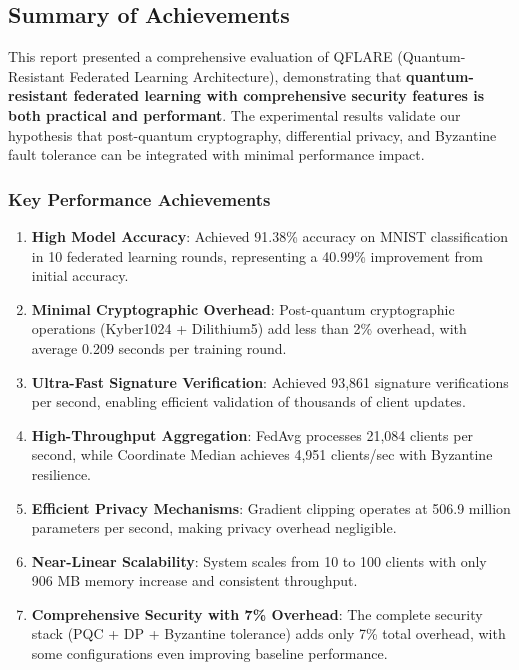 \documentclass[12pt,a4paper]{article}
\begin{document}
\subsection{Summary of Achievements}

This report presented a comprehensive evaluation of QFLARE (Quantum-Resistant Federated Learning Architecture), demonstrating that \textbf{quantum-resistant federated learning with comprehensive security features is both practical and performant}. The experimental results validate our hypothesis that post-quantum cryptography, differential privacy, and Byzantine fault tolerance can be integrated with minimal performance impact.

\subsubsection{Key Performance Achievements}

\begin{enumerate}
    \item \textbf{High Model Accuracy}: Achieved 91.38\% accuracy on MNIST classification in 10 federated learning rounds, representing a 40.99\% improvement from initial accuracy.
    
    \item \textbf{Minimal Cryptographic Overhead}: Post-quantum cryptographic operations (Kyber1024 + Dilithium5) add less than 2\% overhead, with average 0.209 seconds per training round.
    
    \item \textbf{Ultra-Fast Signature Verification}: Achieved 93,861 signature verifications per second, enabling efficient validation of thousands of client updates.
    
    \item \textbf{High-Throughput Aggregation}: FedAvg processes 21,084 clients per second, while Coordinate Median achieves 4,951 clients/sec with Byzantine resilience.
    
    \item \textbf{Efficient Privacy Mechanisms}: Gradient clipping operates at 506.9 million parameters per second, making privacy overhead negligible.
    
    \item \textbf{Near-Linear Scalability}: System scales from 10 to 100 clients with only 906 MB memory increase and consistent throughput.
    
    \item \textbf{Comprehensive Security with 7\% Overhead}: The complete security stack (PQC + DP + Byzantine tolerance) adds only 7\% total overhead, with some configurations even improving baseline performance.
\end{enumerate}
\end{document}
